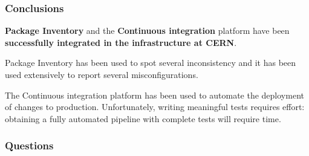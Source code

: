 \documentclass[aspectratio=169]{beamer}
\begin{document}
\begin{frame}
    \frametitle{Conclusions}

    \textbf{Package Inventory} and the \textbf{Continuous integration}
    platform have been \textbf{successfully integrated in the
    infrastructure at CERN}.

    Package Inventory has been used to spot several inconsistency and it has
    been used extensively to report several misconfigurations.

    The Continuous integration platform has been used to automate the
    deployment of changes to production. Unfortunately, writing meaningful
    tests requires effort: obtaining a fully automated pipeline with complete
    tests will require time.
\end{frame}


\begin{frame}
    \frametitle{Questions}
\end{frame}
\end{document}
